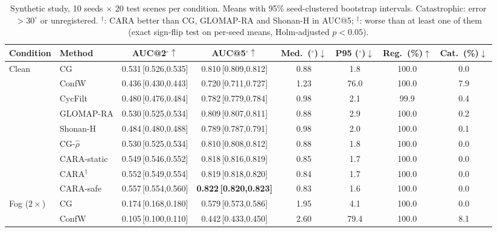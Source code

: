 \begin{table}[!htbp]
\centering
\caption{Synthetic study, 10 seeds $\times$ 20 test scenes per condition. Means with 95\% seed-clustered bootstrap intervals. Catastrophic: error $>30^\circ$ or unregistered. $^\dagger$: CARA better than CG, GLOMAP-RA and Shonan-H in AUC@5; $^\ddagger$: worse than at least one of them (exact sign-flip test on per-seed means, Holm-adjusted $p<0.05$).}
\label{tab:synth}
\setlength{\tabcolsep}{3.2pt}
\footnotesize
\begin{adjustbox}{max width=\textwidth,max totalheight=0.85\textheight}\begin{tabular}{llcccccc}
\toprule
Condition & Method & AUC@2$^\circ\uparrow$ & AUC@5$^\circ\uparrow$ & Med.\ ($^\circ$)$\downarrow$ & P95 ($^\circ$)$\downarrow$ & Reg.\ (\%)$\uparrow$ & Cat.\ (\%)$\downarrow$\\
\midrule
Clean & CG & 0.531\,{\scriptsize[0.526,0.535]} & 0.810\,{\scriptsize[0.809,0.812]} & 0.88 & 1.8 & 100.0 & 0.0\\
 & ConfW & 0.436\,{\scriptsize[0.430,0.443]} & 0.720\,{\scriptsize[0.711,0.727]} & 1.23 & 76.0 & 100.0 & 7.9\\
 & CycFilt & 0.480\,{\scriptsize[0.476,0.484]} & 0.782\,{\scriptsize[0.779,0.784]} & 0.98 & 2.1 & 99.9 & 0.4\\
 & GLOMAP-RA & 0.530\,{\scriptsize[0.525,0.534]} & 0.809\,{\scriptsize[0.807,0.811]} & 0.88 & 2.9 & 100.0 & 0.2\\
 & Shonan-H & 0.484\,{\scriptsize[0.480,0.488]} & 0.789\,{\scriptsize[0.787,0.791]} & 0.98 & 2.0 & 100.0 & 0.1\\
 & CG-$\hat\rho$ & 0.530\,{\scriptsize[0.525,0.534]} & 0.810\,{\scriptsize[0.808,0.812]} & 0.88 & 1.8 & 100.0 & 0.0\\
 & CARA-static & 0.549\,{\scriptsize[0.546,0.552]} & 0.818\,{\scriptsize[0.816,0.819]} & 0.85 & 1.7 & 100.0 & 0.0\\
 & CARA$^{\dagger}$ & 0.552\,{\scriptsize[0.549,0.554]} & 0.819\,{\scriptsize[0.818,0.820]} & 0.84 & 1.7 & 100.0 & 0.0\\
 & CARA-safe & 0.557\,{\scriptsize[0.554,0.560]} & \textbf{0.822\,{\scriptsize[0.820,0.823]}} & 0.83 & 1.6 & 100.0 & 0.0\\
\midrule
Fog ($2\times$) & CG & 0.174\,{\scriptsize[0.168,0.180]} & 0.579\,{\scriptsize[0.573,0.586]} & 1.95 & 4.1 & 100.0 & 0.0\\
 & ConfW & 0.105\,{\scriptsize[0.100,0.110]} & 0.442\,{\scriptsize[0.433,0.450]} & 2.60 & 79.4 & 100.0 & 8.1\\

\end{tabular}
\end{adjustbox}
\end{table}
